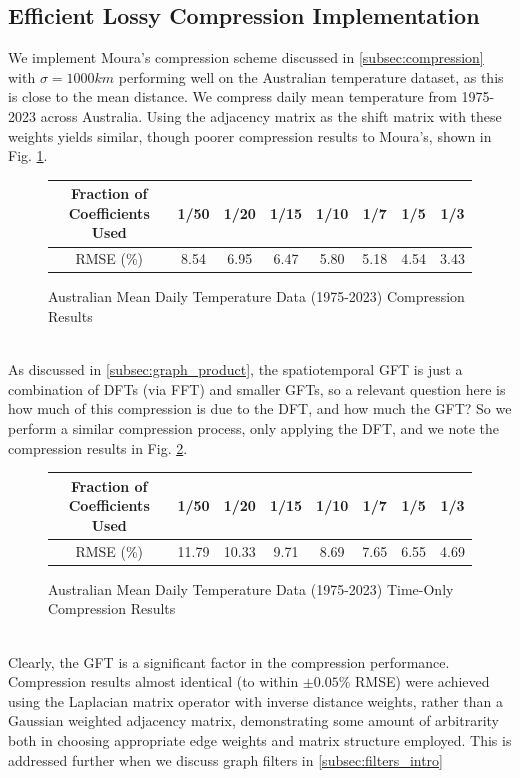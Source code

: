 \documentclass[12pt,a4paper]{article} %
\begin{document}
\subsection{Efficient Lossy Compression Implementation}
\label{subsec:efficient_GFT}
 We implement Moura's compression scheme discussed in \ref{subsec:compression} with $\sigma=1000km$ performing well on the Australian temperature dataset, as this is close to the mean distance. We compress daily mean temperature from 1975-2023 across Australia. Using the adjacency matrix as the shift matrix with these weights yields similar, though poorer compression results to Moura's, shown in Fig. \ref{fig:aus_compression}.
\begin{figure}[!ht]
    \centering
        \begin{tabular}{|c|c|c|c|c|c|c|c|}
         \hline
         Fraction of Coefficients Used & 1/50 & 1/20 & 1/15 & 1/10 & 1/7 & 1/5 & 1/3 \\
         \hline
         RMSE (\%) & 8.54 & 6.95 & 6.47 & 5.80 & 5.18 & 4.54 & 3.43 \\
         \hline
    \end{tabular}
    \caption{Australian Mean Daily Temperature Data (1975-2023) Compression Results}
    \label{fig:aus_compression}
\end{figure}\\
As discussed in \ref{subsec:graph_product}, the spatiotemporal GFT is just a combination of DFTs (via FFT) and smaller GFTs, so a relevant question here is how much of this compression is due to the DFT, and how much the GFT? So we perform a similar compression process, only applying the DFT, and we note the compression results in Fig. \ref{fig:aus_compression2}.
\begin{figure}[!ht]
    \centering
        \begin{tabular}{|c|c|c|c|c|c|c|c|}
         \hline
         Fraction of Coefficients Used & 1/50 & 1/20 & 1/15 & 1/10 & 1/7 & 1/5 & 1/3 \\
         \hline
         RMSE (\%) & 11.79&	10.33&	9.71&	8.69&	7.65&	6.55&	4.69\\
         \hline
    \end{tabular}
    \caption{Australian Mean Daily Temperature Data (1975-2023) Time-Only Compression Results}
    \label{fig:aus_compression2}
\end{figure}\\
Clearly, the GFT is a significant factor in the compression performance. Compression results almost identical (to within $\pm0.05\%$ RMSE) were achieved using the Laplacian matrix operator with inverse distance weights, rather than a Gaussian weighted adjacency matrix, demonstrating some amount of arbitrarity both in choosing appropriate edge weights and matrix structure employed. This is addressed further when we discuss graph filters in \ref{subsec:filters_intro}
\end{document}
